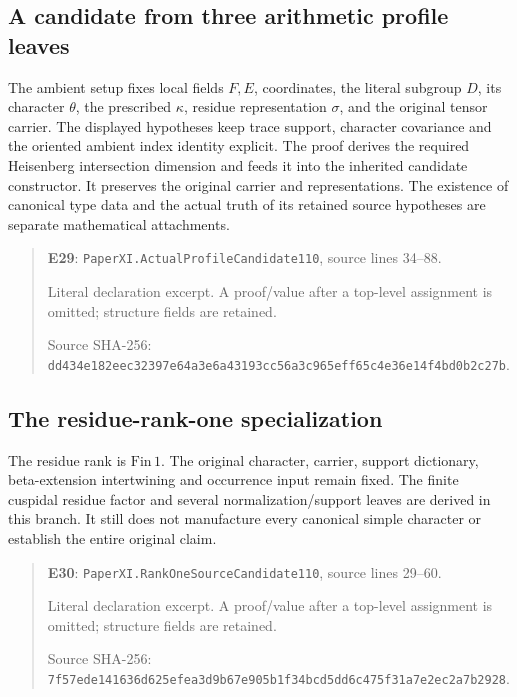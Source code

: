 \documentclass[10pt,oneside]{book}
\begin{document}
\subsection{A candidate from three arithmetic profile leaves}
\label{guide:E29}
The ambient setup fixes local fields \(F,E\), coordinates, the literal subgroup \(D\), its character \(\theta\), the prescribed \(\kappa\), residue representation \(\sigma\), and the original tensor carrier. The displayed hypotheses keep trace support, character covariance and the oriented ambient index identity explicit.
The proof derives the required Heisenberg intersection dimension and feeds it into the inherited candidate constructor. It preserves the original carrier and representations. The existence of canonical type data and the actual truth of its retained source hypotheses are separate mathematical attachments.

\begin{quote}\footnotesize\textbf{E29}: \nolinkurl{PaperXI.ActualProfileCandidate110}, source lines 34--88.\par Literal declaration excerpt. A proof/value after a top-level assignment is omitted; structure fields are retained.\par Source SHA-256: {\scriptsize\texttt{dd434e182eec32397e64a3e6a43193cc56a3c965eff65c4e36e14f4bd0b2c27b}}.\end{quote}


\subsection{The residue-rank-one specialization}
\label{guide:E30}
The residue rank is \(\mathrm{Fin}\,1\). The original character, carrier, support dictionary, beta-extension intertwining and occurrence input remain fixed.
The finite cuspidal residue factor and several normalization/support leaves are derived in this branch. It still does not manufacture every canonical simple character or establish the entire original claim.

\begin{quote}\footnotesize\textbf{E30}: \nolinkurl{PaperXI.RankOneSourceCandidate110}, source lines 29--60.\par Literal declaration excerpt. A proof/value after a top-level assignment is omitted; structure fields are retained.\par Source SHA-256: {\scriptsize\texttt{7f57ede141636d625efea3d9b67e905b1f34bcd5dd6c475f31a7e2ec2a7b2928}}.\end{quote}
\end{document}
